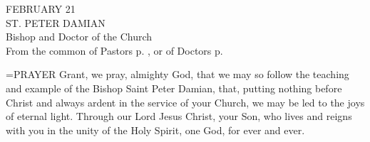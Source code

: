 \begin{center}\normalsize FEBRUARY 21\\
\footnotesize ST. PETER DAMIAN\\
\footnotesize Bishop and Doctor of the Church\\
\footnotesize From the common of Pastors p.  , or of Doctors p. \\
\end{center}

\hangindent=\parindent \small{PRAYER 
Grant, we pray, almighty God,
that we may so follow the teaching and example
of the Bishop Saint Peter Damian,
that, putting nothing before Christ
and always ardent in the service of your Church,
we may be led to the joys of eternal light.
Through our Lord Jesus Christ, your Son,
who lives and reigns with you in the unity of the Holy Spirit,
one God, for ever and ever.\\}
 
